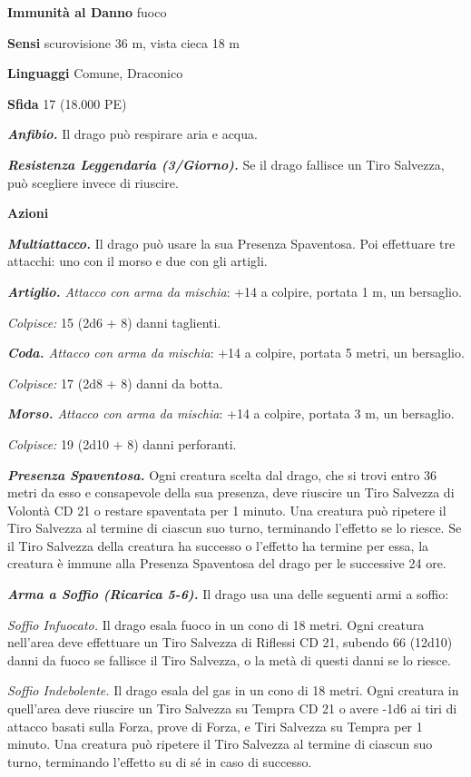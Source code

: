 \begin{multicols}{2}
\textbf{Immunità al Danno} fuoco

\textbf{Sensi} scurovisione 36 m, vista cieca 18 m

\textbf{Linguaggi} Comune, Draconico

\textbf{Sfida} 17 (18.000 PE)

\emph{\textbf{Anfibio.}} Il drago può respirare aria e acqua.

\emph{\textbf{Resistenza Leggendaria (3/Giorno).}} Se il drago fallisce un Tiro Salvezza, può scegliere invece di riuscire.

\textbf{Azioni}

\emph{\textbf{Multiattacco.}} Il drago può usare la sua Presenza Spaventosa. Poi effettuare tre attacchi: uno con il morso e due con gli artigli.

\emph{\textbf{Artiglio.} Attacco con arma da mischia}: +14 a colpire, portata 1 m, un bersaglio.

\emph{Colpisce:} 15 (2d6 + 8) danni taglienti.

\emph{\textbf{Coda.} Attacco con arma da mischia}: +14 a colpire, portata 5 metri, un bersaglio.

\emph{Colpisce:} 17 (2d8 + 8) danni da botta.

\emph{\textbf{Morso.} Attacco con arma da mischia}: +14 a colpire, portata 3 m, un bersaglio.

\emph{Colpisce:} 19 (2d10 + 8) danni perforanti.

\emph{\textbf{Presenza Spaventosa.}} Ogni creatura scelta dal drago, che si trovi entro 36 metri da esso e consapevole della sua presenza, deve riuscire un Tiro Salvezza di Volontà CD 21 o restare spaventata per 1 minuto. Una creatura può ripetere il Tiro Salvezza al termine di ciascun suo turno, terminando l'effetto se lo riesce. Se il Tiro Salvezza della creatura ha successo o l'effetto ha termine per essa, la creatura è immune alla Presenza Spaventosa del drago per le successive 24 ore.

\emph{\textbf{Arma a Soffio (Ricarica 5-6).}} Il drago usa una delle seguenti armi a soffio:

\emph{Soffio Infuocato.} Il drago esala fuoco in un cono di 18 metri. Ogni creatura nell'area deve effettuare un Tiro Salvezza di Riflessi CD 21, subendo 66 (12d10) danni da fuoco se fallisce il Tiro Salvezza, o la metà di questi danni se lo riesce.

\emph{Soffio Indebolente.} Il drago esala del gas in un cono di 18 metri. Ogni creatura in quell'area deve riuscire un Tiro Salvezza su Tempra CD 21 o avere -1d6 ai tiri di attacco basati sulla Forza, prove di Forza, e Tiri Salvezza su Tempra per 1 minuto. Una creatura può ripetere il Tiro Salvezza al termine di ciascun suo turno, terminando l'effetto su di sé in caso di successo.


\end{multicols}

